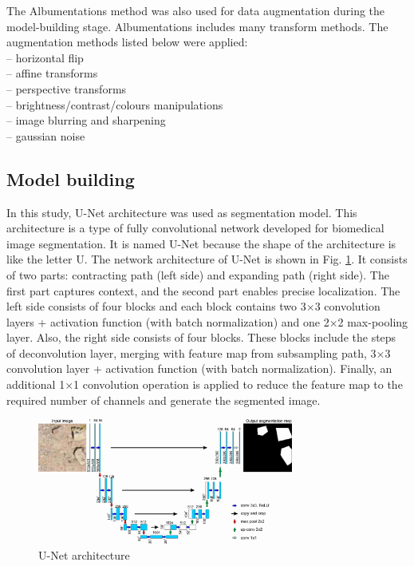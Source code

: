 \documentclass[a4paper,fleqn]{cas-sc}
\begin{document}
The Albumentations \citep{buslaev2020albumentations} method was also used for data augmentation during the model-building stage. Albumentations includes many transform methods. The augmentation methods listed below were applied:\\
– horizontal flip\\
– affine transforms\\
– perspective transforms\\
– brightness/contrast/colours manipulations\\
– image blurring and sharpening\\
– gaussian noise\\

\subsection{Model building}
In this study, U-Net architecture \citep{ronneberger2015u} was used as segmentation model. This architecture is a type of fully convolutional network developed for biomedical image segmentation. It is named U-Net because the shape of the architecture is like the letter U. The network architecture of U-Net is shown in Fig. \ref{fig:Figure5}. It consists of two parts: contracting path (left side) and expanding path (right side). The first part captures context, and the second part enables precise localization. The left side consists of four blocks and each block contains two 3$\times$3 convolution layers + activation function (with batch normalization) and one 2$\times$2 max-pooling layer. Also, the right side consists of four blocks. These blocks include the steps of deconvolution layer, merging with feature map from subsampling path, 3$\times$3 convolution layer + activation function (with batch normalization). Finally, an additional 1$\times$1 convolution operation is applied to reduce the feature map to the required number of channels and generate the segmented image.
\begin{figure}
	\centering
	\includegraphics[width=0.75\textwidth]{fig5.jpg}
	\caption{U-Net architecture}
	\label{fig:Figure5}
\end{figure}
\end{document}
